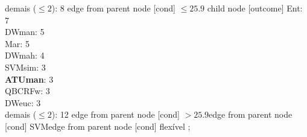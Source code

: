 {{{{%
demais ($\leq 2$): 8} edge from parent node [cond] {$\leq25.9$}}
child {node [outcome] {
Ent: 7\\
DWman: 5\\
Mar: 5\\
DWmah: 4\\
SVMsim: 3\\
\textbf{ATUman}: 3\\
QBCRFw: 3\\
DWeuc: 3\\
demais ($\leq 2$): 12} edge from parent node [cond] {$>25.9$}}edge from parent node [cond] {SVM}}edge from parent node [cond] {flexível}}
%
;
